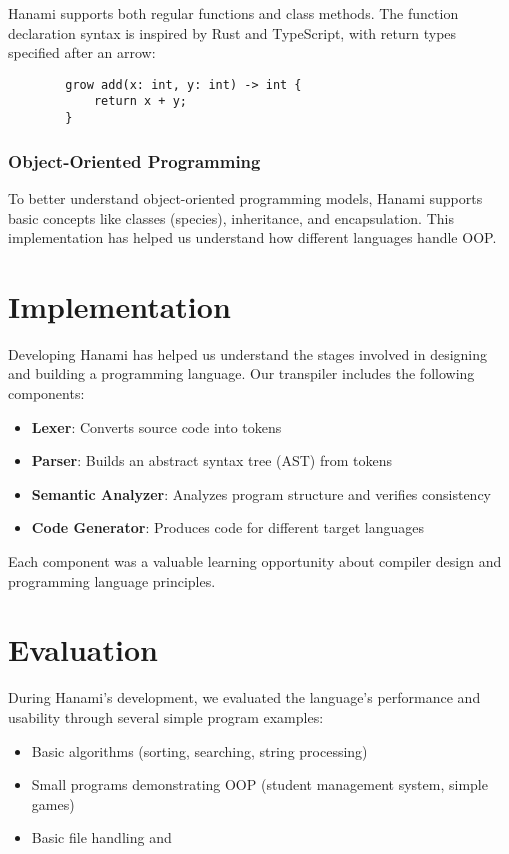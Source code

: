 \documentclass[conference]{IEEEtran}
\begin{document}
	Hanami supports both regular functions and class methods. The function declaration syntax is inspired by Rust and TypeScript, with return types specified after an arrow:
	
	\begin{verbatim}
		grow add(x: int, y: int) -> int {
			return x + y;
		}
	\end{verbatim}
	
	\subsubsection{Object-Oriented Programming}
	
	To better understand object-oriented programming models, Hanami supports basic concepts like classes (species), inheritance, and encapsulation. This implementation has helped us understand how different languages handle OOP.
	
	\section{Implementation}
	\label{sec:implementation}
	
	Developing Hanami has helped us understand the stages involved in designing and building a programming language. Our transpiler includes the following components:
	
	\begin{itemize}
		\item \textbf{Lexer}: Converts source code into tokens
		\item \textbf{Parser}: Builds an abstract syntax tree (AST) from tokens
		\item \textbf{Semantic Analyzer}: Analyzes program structure and verifies consistency
		\item \textbf{Code Generator}: Produces code for different target languages
	\end{itemize}
	
	Each component was a valuable learning opportunity about compiler design and programming language principles.
	
	\section{Evaluation}
	\label{sec:evaluation}
	
	During Hanami's development, we evaluated the language's performance and usability through several simple program examples:
	
	\begin{itemize}
		\item Basic algorithms (sorting, searching, string processing)
		\item Small programs demonstrating OOP (student management system, simple games)
		\item Basic file handling and 
	\end{itemize}
	
\end{document}
